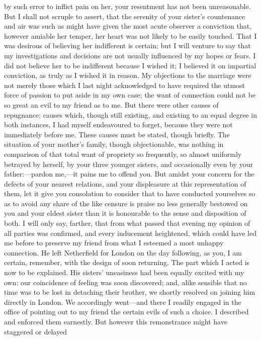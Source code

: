 \documentclass[10pt]{book}
\begin{document}
by such error to inflict pain on her, your resentment has not been
unreasonable. But I shall not scruple to assert, that the serenity of
your sister’s countenance and air was such as might have given the most
acute observer a conviction that, however amiable her temper, her heart
was not likely to be easily touched. That I was desirous of believing
her indifferent is certain; but I will venture to say that my
investigations and decisions are not usually influenced by my hopes or
fears. I did not believe her to be indifferent because I wished it; I
believed it on impartial conviction, as truly as I wished it in reason.
My objections to the marriage were not merely those which I last night
acknowledged to have required the utmost force of passion to put aside
in my own case; the want of connection could not be so great an evil to
my friend as to me. But there were
   other causes of repugnance; causes
which, though still existing, and existing to an equal degree in both
instances, I had myself endeavoured to forget, because they were not
immediately before me. These causes must be stated, though briefly. The
situation of your mother’s family, though objectionable, was nothing in
comparison of that total want of propriety so frequently, so almost
uniformly betrayed by herself, by your three younger sisters, and
occasionally even by your father:—pardon me,—it pains me to offend
you. But amidst your concern for the defects of your nearest relations,
and your displeasure at this representation of them, let it give you
consolation to consider that to have conducted yourselves so as to avoid
any share of the like censure is praise no less generally bestowed on
you and your eldest sister than it is honourable to the sense and
disposition of both. I will only say, farther, that from what passed
that evening my opinion of all parties was confirmed, and every
inducement heightened, which could have led me before to preserve my
friend from what I esteemed a most unhappy connection. He left
Netherfield for London on the day following, as you, I am certain,
remember, with the design of soon returning. The part which I acted is
now to be explained. His sisters’ uneasiness had been equally excited
with my own: our coincidence of feeling was soon discovered; and, alike
sensible that no time was to be lost in detaching their brother, we
shortly resolved on joining him directly in London. We accordingly
went—and there I readily engaged in the office of pointing out to my
friend the certain evils of such a choice. I described and enforced them
earnestly. But however this remonstrance might have staggered or delayed
\end{document}
